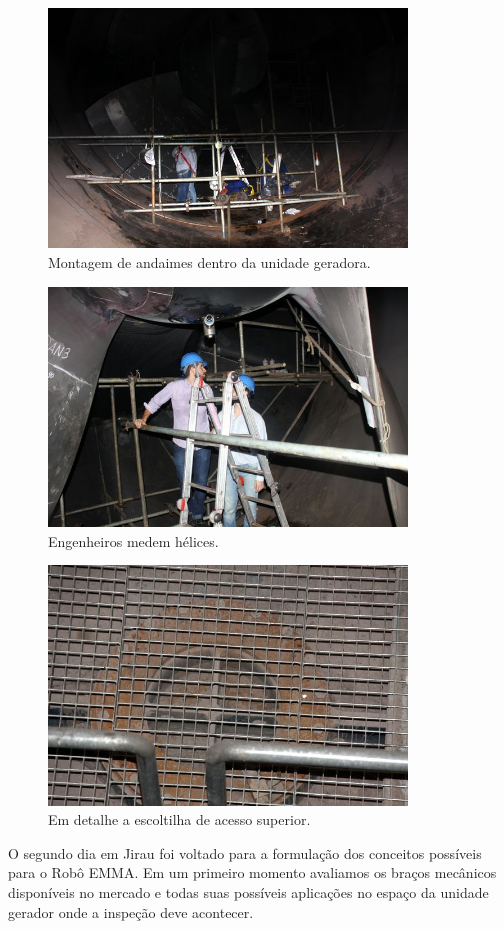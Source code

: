 \documentclass{article}
\begin{document}
\begin{figure}[H]
\centering
\includegraphics[width=0.85\textwidth]{Fotos/img_4931.jpg}
\caption{Montagem de andaimes dentro da unidade geradora.}
\end{figure}

\begin{figure}[H]
\centering
\includegraphics[width=0.85\textwidth]{Fotos/img_4966.jpg}
\caption{Engenheiros medem hélices.}
\end{figure}

\begin{figure}[H]
\centering
\includegraphics[width=0.85\textwidth]{Fotos/img_4978.jpg}
\caption{Em detalhe a escoltilha de acesso superior.}
\end{figure}

O segundo dia em Jirau foi voltado para a formulação dos conceitos possíveis
para o Robô EMMA. Em um primeiro momento avaliamos os braços mecânicos
disponíveis no mercado e todas suas possíveis aplicações no espaço da unidade gerador onde a inspeção deve acontecer.
\end{document}
